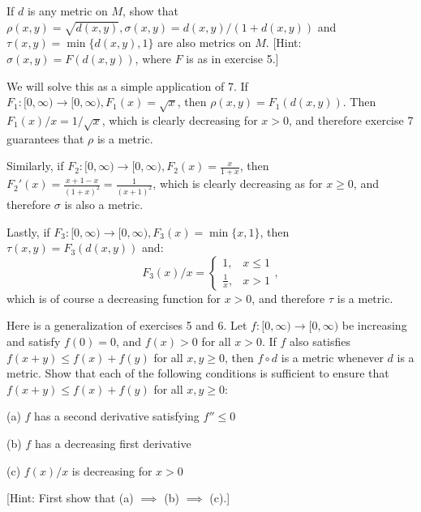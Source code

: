 \newpage

\begin{exercise}{6}
    If $d$ is any metric on $M$, show that $\rho(x, y) = \sqrt{d(x, y)}, \sigma(x, y) = d(x, y)/(1 + d(x, y))$ and $\tau(x, y) = \min\{d(x, y), 1\}$ are also metrics on $M$.
    [Hint: $\sigma(x, y) = F(d(x, y))$, where $F$ is as in exercise 5.]
\end{exercise}

\begin{solution}
    
    We will solve this as a simple application of 7.
    If $F_1: [0, \infty) \rightarrow [0, \infty), F_1(x) = \sqrt{x}$, then $\rho(x, y) = F_1(d(x, y))$.
    Then $F_1(x)/x = 1/\sqrt{x}$, which is clearly decreasing for $x> 0$, and therefore exercise 7 guarantees that $\rho$ is a metric.

    Similarly, if $F_2: [0, \infty) \rightarrow [0, \infty), F_2(x) = \frac{x}{1 + x}$, then $F_2'(x) = \frac{x + 1 - x}{(1 + x)^2} = \frac{1}{(x + 1)^2}$, which is clearly decreasing as for $x \geq 0$, and therefore $\sigma$ is also a metric.

    Lastly, if $F_3: [0, \infty) \rightarrow [0, \infty), F_3(x) = \min\{x, 1\}$, then $\tau(x, y) = F_3(d(x, y))$ and:
    $$F_3(x)/x = \begin{cases}
        1, & x \leq 1 \\
        \frac{1}{x}, & x > 1
    \end{cases},$$
    which is of course a decreasing function for $ x > 0$, and therefore $\tau$ is a metric.
\end{solution}
    
\begin{exercise}{7}
    Here is a generalization of exercises 5 and 6.
    Let $f: [0, \infty) \rightarrow [0, \infty)$ be increasing and satisfy $f(0) = 0$, and $f(x) > 0$ for all $x > 0$.
    If $f$ also satisfies $f(x + y) \leq f(x) + f(y)$ for all $x, y \geq 0$, then $f \circ d$ is a metric whenever $d$ is a metric.
    Show that each of the following conditions is sufficient to ensure that $f(x + y) \leq f(x) + f(y)$ for all $x, y \geq 0$:

    (a) $f$ has a second derivative satisfying $f'' \leq 0$

    (b) $f$ has a decreasing first derivative

    (c) $f(x)/x$ is decreasing for $x > 0$
    
    [Hint: First show that (a) $\implies$ (b) $\implies$ (c).]
\end{exercise}

